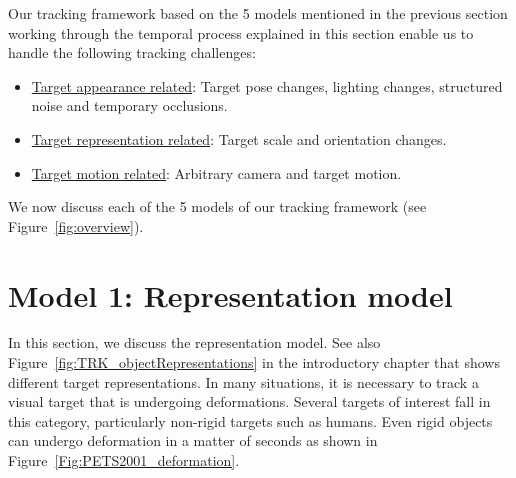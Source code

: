 Our tracking framework based on the 5 models mentioned in the previous section working through the temporal process explained in this section enable us to handle the following tracking challenges:

\begin{itemize}
\item \underline{Target appearance related}: Target pose changes, lighting changes, structured noise and temporary occlusions.
\item  \underline{Target representation related}: Target scale and orientation changes.
\item  \underline{Target motion related}: Arbitrary camera and target motion.
\end{itemize}

We now discuss each of the 5 models of our tracking framework (see Figure~\ref{fig:overview}).  

\section{Model 1: Representation model}
\label{Sec:Representation_model}
In this section, we discuss the representation model.  See also Figure~\ref{fig:TRK_objectRepresentations} in the introductory chapter that shows different target representations.  In many situations, it is necessary to track a visual target that is undergoing deformations.  Several targets of interest fall in this category, particularly non-rigid targets such as humans.  Even rigid objects can undergo deformation in a matter of seconds as shown in Figure~\ref{Fig:PETS2001_deformation}.  

